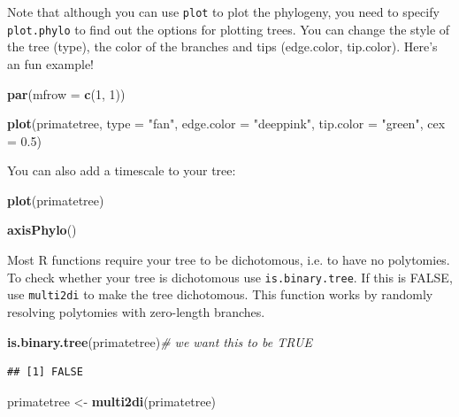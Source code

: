 \documentclass[12pt]{article}
\newcommand{\KeywordTok}[1]{\textcolor[rgb]{0.13,0.29,0.53}{\textbf{{#1}}}}
\newcommand{\DataTypeTok}[1]{\textcolor[rgb]{0.13,0.29,0.53}{{#1}}}
\newcommand{\DecValTok}[1]{\textcolor[rgb]{0.00,0.00,0.81}{{#1}}}
\newcommand{\FloatTok}[1]{\textcolor[rgb]{0.00,0.00,0.81}{{#1}}}
\newcommand{\StringTok}[1]{\textcolor[rgb]{0.31,0.60,0.02}{{#1}}}
\newcommand{\CommentTok}[1]{\textcolor[rgb]{0.56,0.35,0.01}{\textit{{#1}}}}
\newcommand{\NormalTok}[1]{{#1}}
\begin{document}
Note that although you can use \texttt{plot} to plot the phylogeny, you need to specify \texttt{plot.phylo} to find out the options for plotting trees. You can change the style of the tree (type), the color of the branches and tips (edge.color, tip.color). Here’s an fun example! 

\begin{snugshade}
\begin{Highlighting}[]
\KeywordTok{par}\NormalTok{(}\DataTypeTok{mfrow =} \KeywordTok{c}\NormalTok{(}\DecValTok{1}\NormalTok{, }\DecValTok{1}\NormalTok{))}

\KeywordTok{plot}\NormalTok{(primatetree, }\DataTypeTok{type =} \StringTok{"fan"}\NormalTok{, }\DataTypeTok{edge.color =} \StringTok{"deeppink"}\NormalTok{, }\DataTypeTok{tip.color =} 
      \StringTok{"green"}\NormalTok{, }\DataTypeTok{cex =} \FloatTok{0.5}\NormalTok{)}
\end{Highlighting}
\end{snugshade}

You can also add a timescale to your tree:

\begin{snugshade}
\begin{Highlighting}[]
\KeywordTok{plot}\NormalTok{(primatetree)}

\KeywordTok{axisPhylo}\NormalTok{()}
\end{Highlighting}
\end{snugshade}

Most R functions require your tree to be dichotomous, i.e. to have no polytomies. To check whether your tree is dichotomous use \texttt{is.binary.tree}. If this is FALSE, use \texttt{multi2di} to make the tree dichotomous. This function works by randomly resolving polytomies with zero-length branches.

\begin{snugshade}
\begin{Highlighting}[]
\KeywordTok{is.binary.tree}\NormalTok{(primatetree)}\CommentTok{# we want this to be TRUE}
\end{Highlighting}
\end{snugshade}

\begin{verbatim}
## [1] FALSE
\end{verbatim}

\begin{snugshade}
\begin{Highlighting}[]
\NormalTok{primatetree <-}\StringTok{ }\KeywordTok{multi2di}\NormalTok{(primatetree)}
\end{Highlighting}
\end{snugshade}
\end{document}
